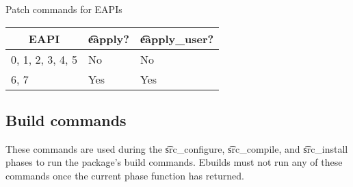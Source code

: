 \begin{centertable}{Patch commands for EAPIs}
    \label{tab:patch-commands}
    \begin{tabular}{lll}
      \toprule
      \multicolumn{1}{c}{\textbf{EAPI}} &
      \multicolumn{1}{c}{\textbf{\t{eapply}?}} &
      \multicolumn{1}{c}{\textbf{\t{eapply_user}?}} \\
      \midrule
      0, 1, 2, 3, 4, 5  & No  & No  \\
      6, 7              & Yes & Yes \\
      \bottomrule
    \end{tabular}
\end{centertable}

\subsection{Build commands}
These commands are used during the \t{src_configure}, \t{src_compile}, and \t{src_install}
phases to run the package's build commands. Ebuilds must not run any of these commands once the
current phase function has returned.

